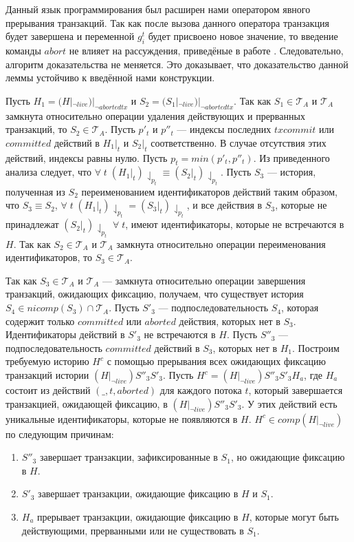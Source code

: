 \begin{myproof}
Данный язык программирования был расширен нами оператором явного прерывания транзакций. Так как после вызова данного оператора транзакция будет завершена и переменной $g^t_i$ будет присвоено новое значение, то введение команды $abort$ не влияет на рассуждения, приведёные в работе \cite{tms_article}. Следовательно, алгоритм доказательства не меняется. Это доказывает, что доказательство данной леммы устойчиво к введённой нами конструкции.

Пусть $H_1 = (H|_{\neg live})|_{\neg abortedtx}$ и $S_2 = (S_1|_{\neg live})|_{\neg abortedtx}$. Так как $S_1 \in \mathcal{T}_A$ и $\mathcal{T}_A$ замкнута относительно операции удаления действующих и прерванных транзакций, то $S_2 \in \mathcal{T}_A$. Пусть $p'_t$ и $p''_t$ --- индексы последних $txcommit$ или $committed$ действий в $H_1|_t$ и $S_2|_t$ соответственно. В случае отсутствия этих действий, индексы равны нулю. Пусть $p_t=min(p'_t,p''_t)$. Из приведенного анализа следует, что $\forall \; t \; (H_1|_t)\downharpoonleft_{p_t} \equiv (S_2|_t)\downharpoonleft_{p_t}$. Пусть $S_3$ --- история, полученная из $S_2$ переименованием идентификаторов действий таким образом, что $S_3 \equiv S_2$, $\forall \; t \; (H_1|_t)\downharpoonleft_{p_t} = (S_3|_t)\downharpoonleft_{p_t}$, и все действия в $S_3$, которые не принадлежат $(S_2|_t)\downharpoonleft_{p_t} \; \forall \; t$, имеют идентификаторы, которые не встречаются в $H$. Так как $S_2 \in \mathcal{T}_A$ и $\mathcal{T}_A$ замкнута относительно операции переименования идентификаторов, то $S_3 \in \mathcal{T}_A$.

Так как $S_3 \in \mathcal{T}_A$ и $\mathcal{T}_A$ --- замкнута относительно операции завершения транзакций, ожидающих фиксацию, получаем, что существует история $S_4 \in nicomp(S_3) \cap \mathcal{T}_A$. Пусть $S'_3$ --- подпоследовательность $S_4$, которая содержит только $committed$ или $aborted$ действия, которых нет в $S_3$. Идентификаторы действий в $S'_3$ не встречаются в $H$. Пусть $S''_3$ --- подпоследовательность $committed$ действий в $S_3$, которых нет в $H_1$. Построим требуемую историю $H^c$ с помощью прерывания всех ожидающих фиксацию транзакций истории $(H|_{\neg live})S''_3S'_3$. Пусть $H^c = (H|_{\neg live})S''_3S'_3H_a$, где $H_a$ состоит из действий $(\_, t, aborted)$ для каждого потока $t$, который завершается транзакцией, ожидающей фиксацию, в $(H|_{\neg live})S''_3S'_3$. У этих действий есть уникальные идентификаторы, которые не появляются в $H$. $H^c \in comp(H|_{\neg live})$ по следующим причинам: 
\begin{enumerate}
\item $S''_3$ завершает транзакции, зафиксированные в $S_1$, но ожидающие фиксацию в $H$.  
\item $S'_3$ завершает транзакции, ожидающие фиксацию в $H$ и $S_1$.
\item $H_a$ прерывает транзакции, ожидающие фиксацию в $H$, которые могут быть действующими, прерванными или не существовать в $S_1$.
\end{enumerate}


\end{myproof}
